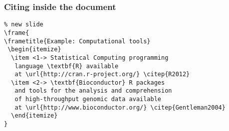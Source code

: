 \begin{frame}[fragile]\small
  \frametitle{Citing inside the document}
    \begin{verbatim}
% new slide
\frame{
\frametitle{Example: Computational tools}
 \begin{itemize}
  \item <1-> Statistical Computing programming 
   language \textbf{R} available 
   at \url{http://cran.r-project.org/} \citep{R2012}
  \item <2-> \textbf{Bioconductor} R packages 
   and tools for the analysis and comprehension 
   of high-throughput genomic data available 
   at \url{http://www.bioconductor.org/} \citep{Gentleman2004}
  \end{itemize}
}
\end{verbatim}
\end{frame}




